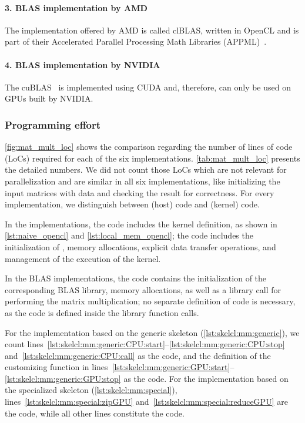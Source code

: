 \vspace{-.5em}
\paragraph{3. BLAS implementation by AMD}
The implementation offered by AMD is called clBLAS, written in OpenCL and is part of their Accelerated Parallel Processing Math Libraries (APPML)~\cite{APPML}.

\vspace{-.5em}
\paragraph{4. BLAS implementation by NVIDIA}
The cuBLAS~\cite{cuBLAS} is implemented using CUDA and, therefore, can only be used on GPUs built by NVIDIA.

\subsubsection*{Programming effort}
\autoref{fig:mat_mult_loc} shows the comparison regarding the number of lines of code (LoCs) required for each of the six implementations.
\autoref{tab:mat_mult_loc} presents the detailed numbers.
We did not count those LoCs which are not relevant for parallelization and are similar in all six implementations, like initializing the input matrices with data and checking the result for correctness.
For every implementation, we distinguish between \CPU (host) code and \GPU (kernel) code.

In the \OpenCL implementations, the \GPU code includes the kernel definition, as shown in \autoref{lst:naive_opencl} and \autoref{lst:local_mem_opencl};
the \CPU code includes the initialization of \OpenCL, memory allocations, explicit data transfer operations, and management of the execution of the kernel.

In the BLAS implementations, the \CPU code contains the initialization of the corresponding BLAS library, memory allocations, as well as a library call for performing the matrix multiplication;
no separate definition of \GPU code is necessary, as the \GPU code is defined inside the library function calls.

For the implementation based on the generic \allpairs skeleton (\autoref{lst:skelcl:mm:generic}), we count lines~\ref{lst:skelcl:mm:generic:CPU:start}--\ref{lst:skelcl:mm:generic:CPU:stop} and~\ref{lst:skelcl:mm:generic:CPU:call} as the \CPU code, and the definition of the customizing function in lines~\ref{lst:skelcl:mm:generic:GPU:start}--\ref{lst:skelcl:mm:generic:GPU:stop} as the \GPU code.
For the implementation based on the specialized \allpairs skeleton (\autoref{lst:skelcl:mm:special}), lines~\ref{lst:skelcl:mm:special:zipGPU} and~\ref{lst:skelcl:mm:special:reduceGPU} are the \GPU code, while all other lines constitute the \CPU code.


